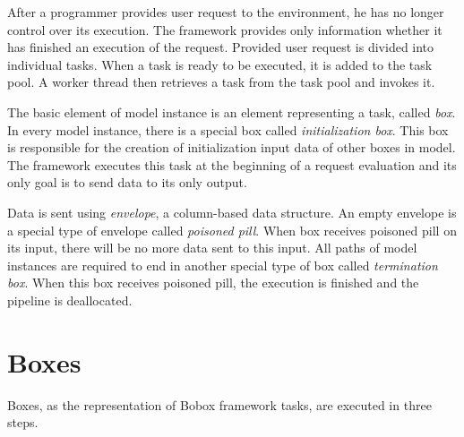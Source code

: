 After a programmer provides user request to the environment, he has no longer control over its execution. The framework provides only information whether it has finished an execution of the request. Provided user request is divided into individual tasks. When a task is ready to be executed, it is added to the task pool. A worker thread then retrieves a task from the task pool and invokes it.

The basic element of model instance is an element representing a task, called \emph{box}. In every model instance, there is a special box called \emph{initialization box}. This box is responsible for the creation of initialization input data of other boxes in model. The framework executes this task at the beginning of a request evaluation and its only goal is to send data to its only output.

Data is sent using \emph{envelope}, a column-based data structure. An empty envelope is a special type of envelope called \emph{poisoned pill}. When box receives poisoned pill on its input, there will be no more data sent to this input. All paths of model instances are required to end in another special type of box called \emph{termination box}. When this box receives poisoned pill, the execution is finished and the pipeline is deallocated.

\section{Boxes}
\label{bobox-boxes}
Boxes, as the representation of Bobox framework tasks, are executed in three steps.

